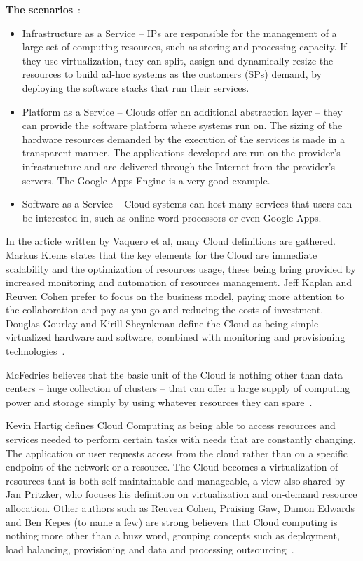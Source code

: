 \textbf{The scenarios}~\cite{knorr,vaquero}:
\begin{itemize}
\item Infrastructure as a Service – IPs are responsible for the management of a large set of computing resources, such as storing and processing capacity. If they use virtualization, they can split, assign and dynamically resize the resources to build ad-hoc systems as the customers (SPs) demand, by deploying the software stacks that run their services.
\item Platform as a Service – Clouds offer an additional abstraction layer – they can provide the software platform where systems run on. The sizing of the hardware resources demanded by the execution of the services is made in a transparent manner. The applications developed are run on the provider's infrastructure and are delivered through the Internet from the provider's servers. The Google Apps Engine is a very good example.
\item Software as a Service – Cloud systems can host many services that users can be interested in, such as online word processors or even Google Apps. 
\end{itemize}

In the article written by Vaquero et al, many Cloud definitions are gathered. Markus Klems states that the key elements for the Cloud are immediate scalability and the optimization of resources usage, these being bring provided by increased monitoring and automation of resources management. Jeff Kaplan and Reuven Cohen prefer to focus on the business model, paying more attention to the collaboration and pay-as-you-go and reducing the costs of investment. Douglas Gourlay and Kirill Sheynkman define the Cloud as being simple virtualized hardware and software, combined with monitoring and provisioning technologies~\cite{21experts,vaquero}.

McFedries believes that the basic unit of the Cloud is nothing other than data centers -- huge collection of clusters -- that can offer a large supply of computing power and storage simply by using whatever resources they can spare~\cite{ieees}.

Kevin Hartig defines Cloud Computing as being able to access resources and services needed to perform certain tasks with needs that are constantly changing. The application or user requests access from the cloud rather than on a specific endpoint of the network or a resource. The Cloud becomes a virtualization of resources that is both self maintainable and manageable, a view also shared by Jan Pritzker, who focuses his definition on virtualization and on-demand resource allocation. Other authors such as Reuven Cohen, Praising Gaw, Damon Edwards and Ben Kepes (to name a few) are strong believers that Cloud computing is nothing more other than a buzz word, grouping concepts such as deployment, load balancing, provisioning and data and processing outsourcing~\cite{21experts}.

